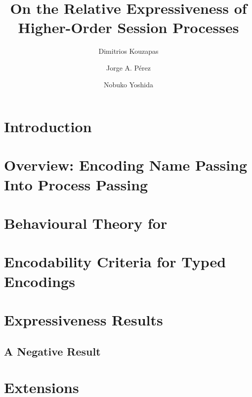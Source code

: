 \documentclass[runningheads]{llncs}
\begin{document}
\title{On the Relative Expressiveness of\\ 
Higher-Order Session Processes
}

\author{
	Dimitrios Kouzapas
	\and
	Jorge A. P\'{e}rez
	\and Nobuko Yoshida
}
\maketitle







\section{Introduction}
\label{sec:intro}


\section{Overview: Encoding Name Passing Into Process Passing}
\label{sec:overview}





\section{Behavioural Theory for \HOp}\label{sec:bt}


\section{Encodability Criteria for Typed Encodings}
\label{s:expr}


\section{Expressiveness Results}
\label{sec:positive}


\subsection{A Negative Result}
\label{ss:negative}


\section{Extensions}
\label{sec:extension}


\end{document}
